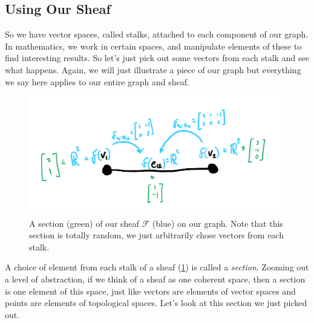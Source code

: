 \documentclass{tufte-handout}
\newcommand{\F}{\mathcal{F}}
\newenvironment{centerquote}%
{\vspace{1em}\begin{center}\Large\itshape}{\end{center}\vspace{1em}}
\begin{document}

%

\subsection{Using Our Sheaf}

So we have vector spaces, called stalks, attached to each component of our graph. In mathematics, we work in certain spaces, and manipulate elements of these to find interesting results. So let's just pick out some vectors from each stalk and see what happens. Again, we will just illustrate a piece of our graph but everything we say here applies to our entire graph and sheaf. 

\begin{figure}[h!]
    \centering
    \includegraphics{arbsection.png}
    \caption{A section (green) of our sheaf $\F$ (blue) on our graph. Note that this section is totally random, we just arbitrarily chose vectors from each stalk.}
    \label{fig:section}
\end{figure}

A choice of element from each stalk of a sheaf (\cref{fig:section}) is called a \emph{section}. Zooming out a level of abstraction, if we think of a sheaf as one coherent space, then a section is one element of this space, just like vectors are elements of vector spaces and points are elements of topological spaces. Let's look at this section we just picked out.
\end{document}
